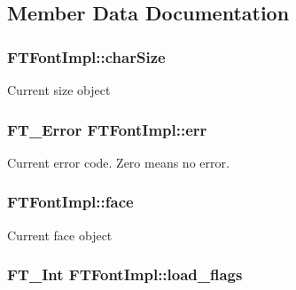 \subsection{Member Data Documentation}
\hypertarget{class_f_t_font_impl_a9ec32ea40b0d1ea53442daec1bbaade1}{
\subsubsection[{charSize}]{ {\bf FTFontImpl::charSize}}}
\label{class_f_t_font_impl_a9ec32ea40b0d1ea53442daec1bbaade1}
Current size object \hypertarget{class_f_t_font_impl_a39510c5a3665ae65bc7ff9b96c25b0c9}{
\subsubsection[{err}]{\setlength{\rightskip}{0pt plus 5cm}FT\_\-Error {\bf FTFontImpl::err}}}
\label{class_f_t_font_impl_a39510c5a3665ae65bc7ff9b96c25b0c9}
Current error code. Zero means no error. \hypertarget{class_f_t_font_impl_ab35b9e1966574c6bb88bff520e9c33df}{
\subsubsection[{face}]{ {\bf FTFontImpl::face}}}
\label{class_f_t_font_impl_ab35b9e1966574c6bb88bff520e9c33df}
Current face object \hypertarget{class_f_t_font_impl_a217737b273e6abaa0dd6d837d5677e56}{
\subsubsection[{load\_\-flags}]{\setlength{\rightskip}{0pt plus 5cm}FT\_\-Int {\bf FTFontImpl::load\_\-flags}}}
\label{class_f_t_font_impl_a217737b273e6abaa0dd6d837d5677e56}

